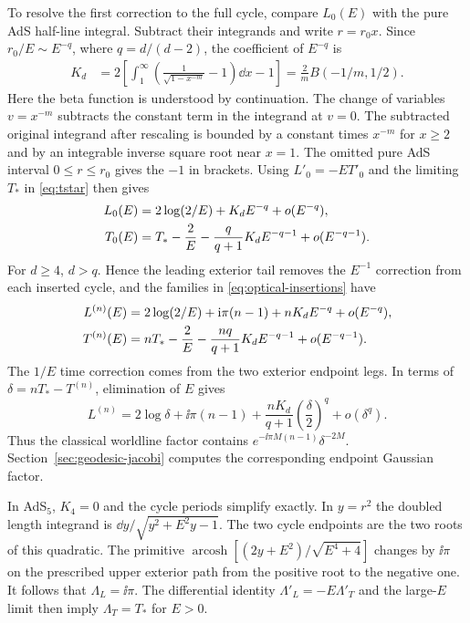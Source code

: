To resolve the first correction to the full cycle, compare
\(L_0(E)\) with the pure AdS half-line integral. Subtract their
integrands and write \(r=r_0 x\). Since \(r_0/E\sim E^{-q}\),
where \(q=d/(d-2)\), the coefficient of \(E^{-q}\) is
\begin{align}
 K_d
 &=2\left[\int_1^\infty
  \left(\frac{1}{\sqrt{1-x^{-m}}}-1\right)\dd x-1\right]
 =\frac{2}{m}B(-1/m,1/2).
 \label{eq:optical-kd}
\end{align}
Here the beta function is understood by continuation. The change
of variables \(v=x^{-m}\) subtracts the constant term in the
integrand at \(v=0\). The subtracted original integrand after
rescaling is bounded by a constant times \(x^{-m}\) for \(x\geq2\)
and by an integrable inverse square root near \(x=1\). The omitted
pure AdS interval \(0\leq r\leq r_0\) gives the \(-1\) in brackets.
Using \(L'_0=-E T'_0\) and the limiting \(T_*\) in
\eqref{eq:tstar} then gives
\begin{align}
 L_0(E)&=2\log(2/E)+K_d E^{-q}+o(E^{-q}),\notag\\
 T_0(E)&=T_*-\frac{2}{E}
         -\frac{q}{q+1}K_d E^{-q-1}+o(E^{-q-1}) .
 \label{eq:optical-ref-correction}
\end{align}
For \(d\geq4\), \(d>q\). Hence the leading exterior tail removes
the \(E^{-1}\) correction from each inserted cycle, and the
families in \eqref{eq:optical-insertions} have
\begin{align}
 L^{(n)}(E)&=2\log(2/E)+\mathrm{i}\pi(n-1)+nK_d E^{-q}+o(E^{-q}),\notag\\
 T^{(n)}(E)&=nT_*-\frac2E
   -\frac{nq}{q+1}K_d E^{-q-1}+o(E^{-q-1}) .
 \label{eq:optical-period-asymptotics}
\end{align}
The \(1/E\) time correction comes from the two exterior endpoint
legs. In terms of \(\delta=nT_*-T^{(n)}\), elimination of \(E\)
gives
\begin{equation}
 L^{(n)}
   =2\log\delta+\ii\pi(n-1)
    +\frac{nK_d}{q+1}\left(\frac{\delta}{2}\right)^q
    +o(\delta^q).
 \label{eq:optical-fixed-time}
\end{equation}
Thus the classical worldline factor contains
\(e^{-\ii\pi M(n-1)}\delta^{-2M}\). Section~\ref{sec:geodesic-jacobi}
computes the corresponding endpoint Gaussian factor.

In AdS\(_5\), \(K_4=0\) and the cycle periods simplify exactly.
In \(y=r^2\) the doubled length integrand is
\(\dd y/\sqrt{y^2+E^2 y-1}\). The two cycle endpoints are the two
roots of this quadratic. The primitive
\(\operatorname{arcosh}[(2y+E^2)/\sqrt{E^4+4}]\) changes by
\(\ii\pi\) on the prescribed upper exterior path from the positive
root to the negative one. It follows that \(\Lambda_L=\ii\pi\).
The differential identity \(\Lambda'_L=-E\Lambda'_T\) and the
large-\(E\) limit then imply \(\Lambda_T=T_*\) for \(E>0\).

